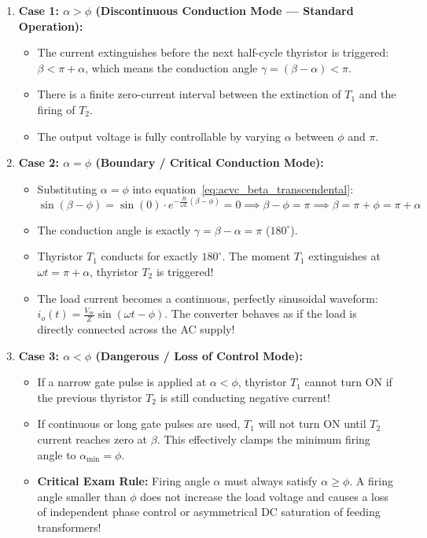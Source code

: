 \documentclass[11pt,a4paper]{article}
\begin{document}
\begin{enumerate}[leftmargin=*]
  \item \textbf{Case 1: $\alpha > \phi$ (Discontinuous Conduction Mode --- Standard Operation):}
  \begin{itemize}
    \item The current extinguishes before the next half-cycle thyristor is triggered: $\beta < \pi + \alpha$, which means the conduction angle $\gamma = (\beta - \alpha) < \pi$.
    \item There is a finite zero-current interval between the extinction of $T_1$ and the firing of $T_2$.
    \item The output voltage is fully controllable by varying $\alpha$ between $\phi$ and $\pi$.
  \end{itemize}

  \item \textbf{Case 2: $\alpha = \phi$ (Boundary / Critical Conduction Mode):}
  \begin{itemize}
    \item Substituting $\alpha = \phi$ into equation~\eqref{eq:acvc_beta_transcendental}:
    \begin{equation}
    \sin(\beta - \phi) = \sin(0) \cdot e^{-\frac{R}{\omega L}(\beta - \phi)} = 0 \implies \beta - \phi = \pi \implies \beta = \pi + \phi = \pi + \alpha
    \end{equation}
    \item The conduction angle is exactly $\gamma = \beta - \alpha = \pi$ ($180^\circ$).
    \item Thyristor $T_1$ conducts for exactly $180^\circ$. The moment $T_1$ extinguishes at $\omega t = \pi + \alpha$, thyristor $T_2$ is triggered!
    \item The load current becomes a continuous, perfectly sinusoidal waveform: $i_o(t) = \frac{V_m}{Z}\sin(\omega t - \phi)$. The converter behaves as if the load is directly connected across the AC supply!
  \end{itemize}

  \item \textbf{Case 3: $\alpha < \phi$ (Dangerous / Loss of Control Mode):}
  \begin{itemize}
    \item If a narrow gate pulse is applied at $\alpha < \phi$, thyristor $T_1$ cannot turn ON if the previous thyristor $T_2$ is still conducting negative current!
    \item If continuous or long gate pulses are used, $T_1$ will not turn ON until $T_2$ current reaches zero at $\beta$. This effectively clamps the minimum firing angle to $\alpha_{\text{min}} = \phi$.
    \item \textbf{Critical Exam Rule:} Firing angle $\alpha$ must always satisfy $\alpha \ge \phi$. A firing angle smaller than $\phi$ does not increase the load voltage and causes a loss of independent phase control or asymmetrical DC saturation of feeding transformers!
  \end{itemize}
\end{enumerate}
\end{document}

